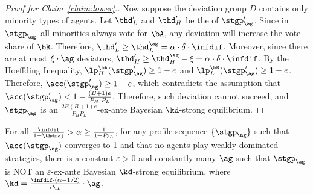 \begin{proof}[Proof for Claim~\ref{claim:lower}.]
    Now suppose the deviation group $D$ contains only minority types of agents. Let $\thd_L'$ and $\thd_H'$ be the \exshare{} of $\stgp'_\ag$. Since in $\stgp_\ag$ all minorities always vote for $\bA$, any deviation will increase the vote share of $\bR$. Therefore, $\thd_L' \ge \thd_L^\ag = \alpha \cdot \delta\cdot \infdif$. Moreover, since there are at most $\xi\cdot \ag$ deviators, $\thd_H' \ge \thd_H^\ag - \xi = \alpha \cdot \delta \cdot \infdif$. By the Hoeffding Inequality, $\lp_H^{\bA}(\stgp'_\ag) \ge 1 - e$ and $\lp_L^{\bR}(\stgp'_\ag) \ge 1 - e$. Therefore, $\acc(\stgp'_\ag) \ge 1 - e$, which contradicts the assumption that $\acc(\stgp'_\ag) < 1 - \frac{(B+1)e}{P_H\cdot P_L}$. Therefore, such deviation cannot succeed, and $\stgp_\ag$ is an $\frac{2B(B+1)e}{P_HP_L}$-ex-ante Bayesian $\kd$-strong equilibrium. 
\end{proof}

\begin{claim}
\label{claim:upper2}
    For all $\frac{\infdif}{1 - \thdmaj} > \alpha \ge \frac{1}{1 + P_{\ell L}}$, for any profile sequence $\{\stgp_\ag\}$ such that $\acc(\stgp_\ag)$ converges to 1 and that no agents play weakly dominated strategies, there is a constant $\varepsilon > 0$ and constantly many $\ag$ such that $\stgp_\ag$ is NOT an $\varepsilon$-ex-ante Bayesian $\kd$-strong equilibrium, where $\kd = \frac{\infdif \cdot (\alpha - 1/2)}{P_{hL}}\cdot \ag$. 
\end{claim}

